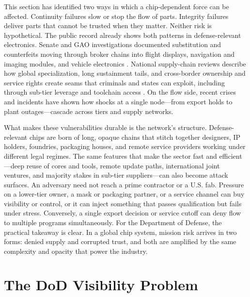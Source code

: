 This section has identified two ways in which a chip-dependent force can be affected. Continuity failures slow or stop the flow of parts. Integrity failures deliver parts that cannot be trusted when they matter. Neither risk is hypothetical. The public record already shows both patterns in defense-relevant electronics. Senate and GAO investigations documented substitution and counterfeits moving through broker chains into flight displays, navigation and imaging modules, and vehicle electronics \parencite{united_states_senate_committee_on_armed_services_senate_2012,U.S.GovernmentAccountabilityOffice2012}. National supply-chain reviews describe how global specialization, long sustainment tails, and cross-border ownership and service rights create seams that criminals and states can exploit, including through sub-tier leverage and toolchain access \parencite{khan_semiconductor_2021,national_science_and_technology_council_national_2024}. On the flow side, recent crises and incidents have shown how shocks at a single node---from export holds to plant outages---cascade across tiers and supply networks.

What makes these vulnerabilities durable is the network's structure. Defense-relevant chips are born of long, opaque chains that stitch together designers, IP holders, foundries, packaging houses, and remote service providers working under different legal regimes. The same features that make the sector fast and efficient---deep reuse of cores and tools, remote update paths, international joint ventures, and majority stakes in sub-tier suppliers---can also become attack surfaces. An adversary need not reach a prime contractor or a U.S. fab. Pressure on a lower-tier owner, a mask or packaging partner, or a service channel can buy visibility or control, or it can inject something that passes qualification but fails under stress. Conversely, a single export decision or service cutoff can deny flow to multiple programs simultaneously. For the Department of Defense, the practical takeaway is clear. In a global chip system, mission risk arrives in two forms: denied supply and corrupted trust, and both are amplified by the same complexity and opacity that power the industry.

\section{The DoD Visibility Problem}
\label{sec:visibility-pipeline}

